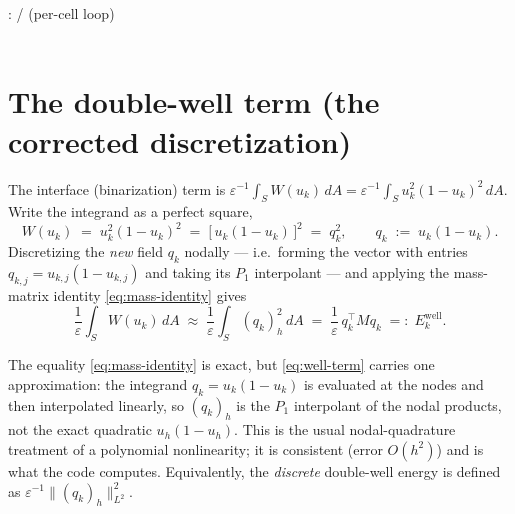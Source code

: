 \documentclass[11pt,a4paper]{article}
\begin{document}
\begin{tcolorbox}[colback=blue!4!white, colframe=blue!40!black,
                  title={Code: Dirichlet term and gradient}, fontupper=\small]
:
 /  (per-cell loop)\\[2pt]
\\
\end{tcolorbox}

\section{The double-well term (the corrected discretization)}
\label{sec:doublewell}

The interface (binarization) term is
$\varepsilon^{-1}\int_S W(u_k)\,dA = \varepsilon^{-1}\int_S u_k^2(1-u_k)^2\,dA$.
Write the integrand as a perfect square,
\begin{equation}
  W(u_k) \;=\; u_k^2(1-u_k)^2 \;=\; \big[\,u_k(1-u_k)\,\big]^2 \;=\; q_k^2,
  \qquad
  q_k \;:=\; u_k(1-u_k).
  \label{eq:q-def}
\end{equation}
Discretizing the \emph{new} field $q_k$ nodally --- i.e.\ forming the vector with
entries $q_{k,j}=u_{k,j}(1-u_{k,j})$ and taking its $P_1$ interpolant --- and applying
the mass-matrix identity \eqref{eq:mass-identity} gives
\begin{equation}
  \frac{1}{\varepsilon}\int_S W(u_k)\,dA
  \;\approx\;
  \frac{1}{\varepsilon}\int_S (q_k)_h^2 \, dA
  \;=\;
  \frac{1}{\varepsilon}\, q_k^\top M q_k
  \;=\!:\; E^{\mathrm{well}}_k .
  \label{eq:well-term}
\end{equation}

\begin{remark}
The equality \eqref{eq:mass-identity} is exact, but \eqref{eq:well-term} carries one
approximation: the integrand $q_k=u_k(1-u_k)$ is evaluated at the nodes and then
interpolated linearly, so $(q_k)_h$ is the $P_1$ interpolant of the nodal products,
not the exact quadratic $u_h(1-u_h)$. This is the usual nodal-quadrature treatment of
a polynomial nonlinearity; it is consistent (error $O(h^2)$) and is what the code
computes. Equivalently, the \emph{discrete} double-well energy is defined as
$\varepsilon^{-1}\lVert (q_k)_h \rVert_{L^2}^2$.
\end{remark}
\end{document}
